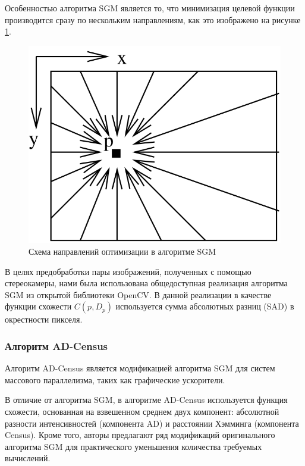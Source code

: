 \documentclass[aps,%
14pt,%
final,%
oneside,
onecolumn,%
musixtex, %
superscriptaddress,%
centertags]{extarticle} %
\begin{document}
Особенностью алгоритма SGM является то, что минимизация целевой функции производится сразу по нескольким направлениям, как это изображено на рисунке \ref{fig:sgm_paths}.

\begin{figure}[htp]
\centering
\includegraphics[scale=0.3]{sgm_paths.png}
\caption{Схема направлений оптимизации в алгоритме SGM \cite{hirschmuller2005accurate}}
\label{fig:sgm_paths}
\end{figure}

В целях предобработки пары изображений, полученных с помощью стереокамеры, нами была использована общедоступная реализация алгоритма SGM из открытой библиотеки OpenCV. В данной реализации в качестве функции схожести $C(p, D_p)$ используется сумма абсолютных разниц (SAD) в окрестности пикселя.

\subsubsection{Алгоритм AD-Census}
Алгоритм AD-Census \cite{mei2011building} является модификацией алгоритма SGM для систем массового параллелизма, таких как графические ускорители.

В отличие от алгоритма SGM, в алгоритме AD-Census используется функция схожести, основанная на взвешенном среднем двух компонент: абсолютной разности интенсивностей (компонента AD) и расстоянии Хэмминга (компонента Census). Кроме того, авторы предлагают ряд модификаций оригинального алгоритма SGM для практического уменьшения количества требуемых вычислений.
\end{document}
